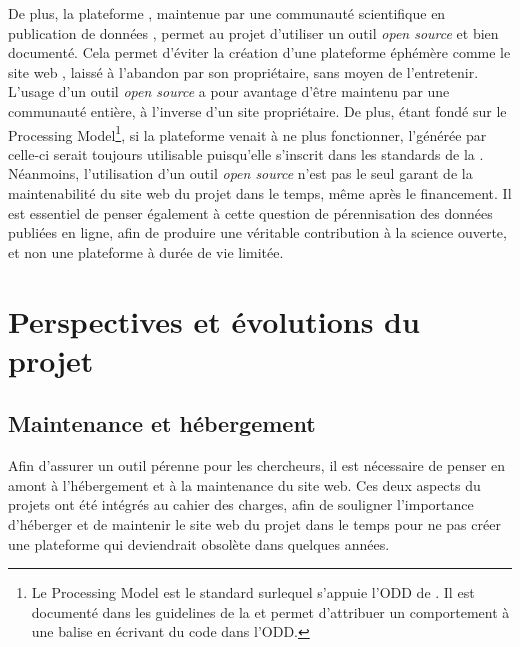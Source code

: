 De plus, la plateforme \tp, maintenue par une communauté scientifique en publication de données \TEI, permet au projet \COREL d'utiliser un outil \textit{open source} et bien documenté. Cela permet d'éviter la création d'une plateforme éphémère comme le site web \LSC, laissé à l'abandon par son propriétaire, sans moyen de l'entretenir. L'usage d'un outil \textit{open source} a pour avantage d'être maintenu par une communauté entière, à l'inverse d'un site propriétaire. De plus, \tp étant fondé sur le \TEI Processing Model\footnote{Le \TEI Processing Model est le standard surlequel s'appuie l'ODD de \tp. Il est documenté dans les guidelines de la \TEI et permet d'attribuer un comportement à une balise en écrivant du code dans l'ODD.}, si la plateforme venait à ne plus fonctionner, l'\ODD générée par celle-ci serait toujours utilisable puisqu'elle s'inscrit dans les standards de la \TEI. Néanmoins, l'utilisation d'un outil \textit{open source} n'est pas le seul garant de la maintenabilité du site web du projet dans le temps, même après le financement. Il est essentiel de penser également à cette question de pérennisation des données publiées en ligne, afin de produire une véritable contribution à la science ouverte, et non une plateforme à durée de vie limitée. 

 \section{Perspectives et évolutions du projet }
    \subsection{Maintenance et hébergement}
Afin d'assurer un outil pérenne pour les chercheurs, il est nécessaire de penser en amont à l'hébergement et à la maintenance du site web. Ces deux aspects du projets ont été intégrés au cahier des charges, afin de souligner l'importance d'héberger et de maintenir le site web du projet dans le temps pour ne pas créer une plateforme qui deviendrait obsolète dans quelques années. 

